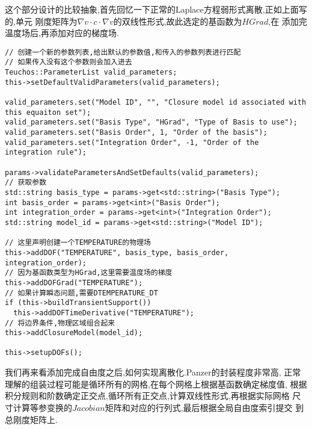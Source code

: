 这个部分设计的比较抽象,首先回忆一下正常的Laplace方程弱形式离散,正如上面写的,单元
刚度矩阵为$\nabla v\cdot c \cdot\nabla v$的双线性形式,故此选定的基函数为$HGrad$,在
添加完温度场后,再添加对应的梯度场.
\begin{lstlisting}
// 创建一个新的参数列表,给出默认的参数值,和传入的参数列表进行匹配
// 如果传入没有这个参数则会加入进去
Teuchos::ParameterList valid_parameters;
this->setDefaultValidParameters(valid_parameters);

valid_parameters.set("Model ID", "", "Closure model id associated with this equaiton set");
valid_parameters.set("Basis Type", "HGrad", "Type of Basis to use");
valid_parameters.set("Basis Order", 1, "Order of the basis");
valid_parameters.set("Integration Order", -1, "Order of the integration rule");

params->validateParametersAndSetDefaults(valid_parameters);
// 获取参数
std::string basis_type = params->get<std::string>("Basis Type");
int basis_order = params->get<int>("Basis Order");
int integration_order = params->get<int>("Integration Order");
std::string model_id = params->get<std::string>("Model ID");

// 这里声明创建一个TEMPERATURE的物理场
this->addDOF("TEMPERATURE", basis_type, basis_order, integration_order);
// 因为基函数类型为HGrad,这里需要温度场的梯度
this->addDOFGrad("TEMPERATURE");
// 如果计算瞬态问题,需要DTEMPERATURE_DT
if (this->buildTransientSupport())
  this->addDOFTimeDerivative("TEMPERATURE");
// 将边界条件,物理区域组合起来
this->addClosureModel(model_id);

this->setupDOFs();
\end{lstlisting}

我们再来看添加完成自由度之后,如何实现离散化.Panzer的封装程度非常高,
正常理解的组装过程可能是循环所有的网格,在每个网格上根据基函数确定梯度值,
根据积分规则和阶数确定正交点,循环所有正交点,计算双线性形式,再根据实际网格
尺寸计算等参变换的$Jacobian$矩阵和对应的行列式,最后根据全局自由度索引提交
到总刚度矩阵上.

